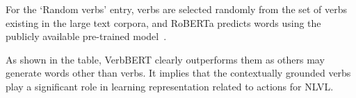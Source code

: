For the `Random verbs' entry, verbs are selected randomly from the set of verbs existing in the large text corpora, and RoBERTa predicts words using the publicly available pre-trained model~\cite{huggingface}. 

As shown in the table, VerbBERT clearly outperforms them as others may generate words other than verbs. 
It implies that the contextually grounded verbs play a significant role in learning representation related to actions for NLVL.


\begin{table}[t]
\centering
{}
\caption{\textbf{Verb inference methods}.
`Random verbs' are sampled from the verb classes of the VerbBERT model.
RoBERTa predicts any words in the missing location, whereas VerbBERT only predicts the verbs by the fine-tuning.
}
\vspace{-1em}
\label{table:verbbert}
\end{table}



